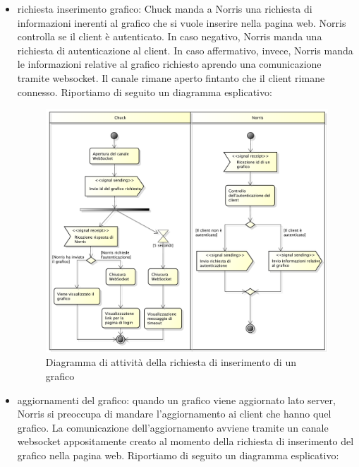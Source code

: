 \begin{itemize}
            \item richiesta inserimento grafico: Chuck manda a Norris una richiesta di informazioni inerenti al grafico che si vuole inserire nella pagina web. Norris controlla se il client è autenticato. In caso negativo, Norris manda una richiesta di autenticazione al client. In caso affermativo, invece, Norris manda le informazioni relative al grafico richiesto aprendo una comunicazione tramite websocket. Il canale rimane aperto fintanto che il client rimane connesso. Riportiamo di seguito un diagramma esplicativo:
            \begin{figure}[H]\centering
        	\includegraphics[width=\textwidth]{SpecificaTecnica/Pics/Chuck/RichiestaGrafico.pdf}
        	\caption{Diagramma di attività della richiesta di inserimento di un grafico}
    		\end{figure}
            \item aggiornamenti del grafico: quando un grafico viene aggiornato lato server, Norris si preoccupa di mandare l'aggiornamento ai client che hanno quel grafico. La comunicazione dell'aggiornamento avviene tramite un canale websocket appositamente creato al momento della richiesta di inserimento del grafico nella pagina web. Riportiamo di seguito un diagramma esplicativo:
            \begin{figure}[H]\centering

\end{figure}
\end{itemize}
